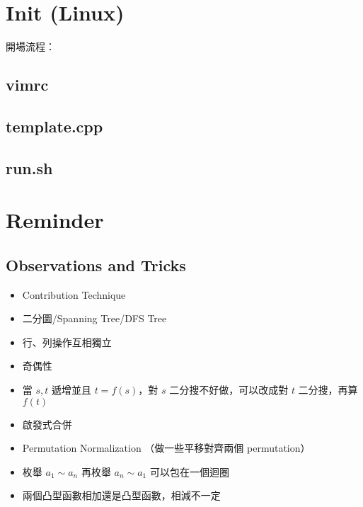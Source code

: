 \documentclass[a4paper,10pt,twocolumn,oneside]{article}
\begin{document}
\renewcommand{\headrulewidth}{0.4pt}
\renewcommand{\contentsname}{Contents} 

\pagestyle{fancy}
\fancyfoot{}
\fancyhead[R]{\thepage}


{\scriptsize
\tableofcontents}


\section{Init (Linux)}

開場流程：


\subsection{vimrc}


\subsection{template.cpp}


\subsection{run.sh}



%


\section{Reminder}

\subsection{Observations and Tricks}
\begin{itemize}[nolistsep]
    \item Contribution Technique
    \item 二分圖/Spanning Tree/DFS Tree
    \item 行、列操作互相獨立
    \item 奇偶性
    \item 當 $s, t$ 遞增並且 $t = f(s)$，對 $s$ 二分搜不好做，可以改成對 $t$ 二分搜，再算 $f(t)$
    \item 啟發式合併
    \item Permutation Normalization （做一些平移對齊兩個 permutation）
    \item 枚舉 $a_1 \sim a_n$ 再枚舉 $a_n \sim a_1$ 可以包在一個迴圈
    \item 兩個凸型函數相加還是凸型函數，相減不一定
\end{itemize}
\end{document}
